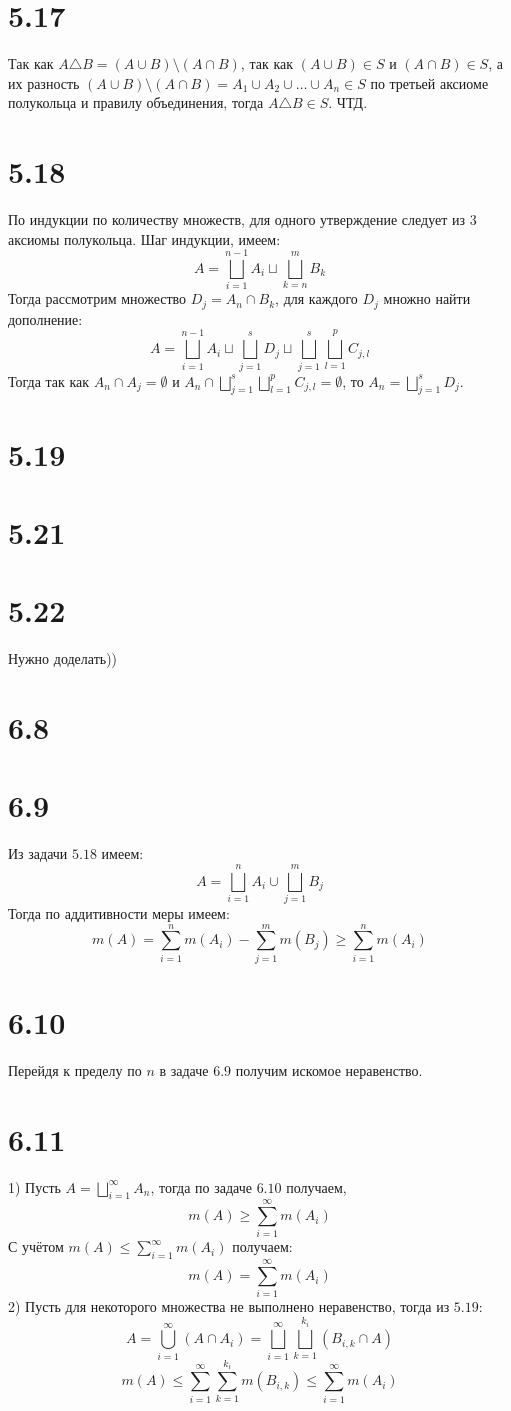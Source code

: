 \documentclass[12pt]{article}
\begin{document}
\section{5.17}
Так как $A \triangle B = (A \cup B) \setminus (A \cap B)$, так как $(A \cup B) \in S$ и $(A \cap B) \in S$,
а их разность $(A \cup B) \setminus (A \cap B) = A_1 \cup A_2 \cup \dots \cup A_n \in S$  по третьей аксиоме полукольца и правилу объединения, тогда $A \triangle B \in S$. ЧТД.
\section{5.18}
По индукции по количеству множеств, для одного утверждение следует из 3 аксиомы полукольца. Шаг индукции, имеем:
\[
    A = \bigsqcup_{i=1}^{n-1} A_i \sqcup \bigsqcup_{k=n}^{m} B_k
\]
Тогда рассмотрим множество $D_j = A_n \cap B_k$, для каждого $D_j$ множно найти дополнение:
\[
    A = \bigsqcup_{i=1}^{n-1} A_i \sqcup \bigsqcup_{j=1}^{s} D_j \sqcup \bigsqcup_{j=1}^{s} \bigsqcup_{l=1}^{p} C_{j, l}
\]
Тогда так как $A_n \cap A_j = \emptyset$ и $A_n \cap \bigsqcup_{j=1}^{s} \bigsqcup_{l=1}^{p} C_{j, l} = \emptyset$, то $A_n = \bigsqcup_{j=1}^{s} D_j$.
\section{5.19}
\section{5.21}
\section{5.22}
Нужно доделать))
\section{6.8}
\section{6.9}
Из задачи $5.18$ имеем:
\[
    A = \bigsqcup_{i=1}^{n} A_i \cup \bigsqcup_{j=1}^{m} B_j
\]
Тогда по аддитивности меры имеем:
\[
    m(A) = \sum_{i=1}^{n} m(A_i) - \sum_{j=1}^{m} m(B_j) \geq \sum_{i=1}^{n} m(A_i)
\]
\section{6.10}
Перейдя к пределу по $n$ в задаче $6.9$ получим искомое неравенство.
\section{6.11}
1) Пусть $A = \bigsqcup_{i=1}^{\infty} A_n$, тогда по задаче $6.10$ получаем,
\[
    m(A) \geq \sum_{i=1}^{\infty} m(A_i)
\]
С учётом $m(A) \leq \sum_{i=1}^{\infty} m(A_i)$ получаем:
\[
    m(A) = \sum_{i=1}^{\infty} m(A_i)
\]
2) Пусть для некоторого множества не выполнено неравенство, тогда из $5.19$:
\[
    A = \bigcup_{i=1}^{\infty} (A \cap A_i) = \bigsqcup_{i=1}^{\infty} \bigsqcup_{k=1}^{k_i} (B_{i, k} \cap A)
\]
\[
    m(A) \leq \sum_{i=1}^{\infty} \sum_{k=1}^{k_i} m(B_{i, k}) \leq \sum_{i=1}^{\infty} m(A_i)
\]
\end{document}
